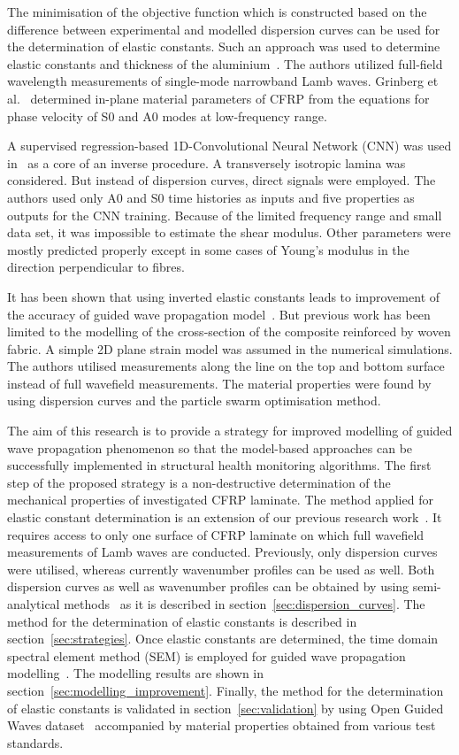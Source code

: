 \documentclass[preprint,12pt]{elsarticle}
\begin{document}
The minimisation of the objective function which is constructed based on the difference between experimental and modelled dispersion curves can be used for the determination of elastic constants.
Such an approach was used to determine elastic constants and thickness of the aluminium~\cite{Dean2008}.
The authors utilized full-field wavelength measurements of single-mode narrowband Lamb waves. Grinberg et al.~\cite{Grimberg2010} determined in-plane material parameters of CFRP from the equations for phase velocity of S0 and A0 modes at low-frequency range.

A supervised regression-based 1D-Convolutional Neural Network (CNN) was used in~\cite{Rautela2020} as a core of an inverse procedure.
A transversely isotropic lamina was considered. 
But instead of dispersion curves, direct signals were employed.
The authors used only A0 and S0 time histories as inputs and five properties as outputs for the CNN training.
Because of the limited frequency range and small data set, it was impossible to estimate the shear modulus. 
Other parameters were mostly predicted properly except in some cases of Young's modulus in the direction perpendicular to fibres.

It has been shown that using inverted elastic constants leads to improvement of the accuracy of guided wave propagation model~\cite{Ong2016}.
But previous work has been limited to the modelling of the cross-section of the composite reinforced by woven fabric.
A simple 2D plane strain model was assumed in the numerical simulations.
The authors utilised measurements along the line on the top and bottom surface instead of full wavefield measurements.
The material properties were found by using dispersion curves and the particle swarm optimisation method.

The aim of this research is to provide a strategy for improved modelling of guided wave propagation phenomenon so that the model-based approaches can be successfully implemented in structural health monitoring algorithms.
The first step of the proposed strategy is a non-destructive determination of the mechanical properties of investigated CFRP laminate.
The method applied for elastic constant determination is an extension of our previous research work~\cite{Kudela2020}.	
It requires access to only one surface of CFRP laminate on which full wavefield measurements of Lamb waves are conducted.
Previously, only dispersion curves were utilised, whereas currently wavenumber profiles can be used as well.
Both dispersion curves as well as wavenumber profiles can be obtained by using semi-analytical methods~\cite{Bartoli2006,Marzani2008} as it is described in section~\ref{sec:dispersion_curves}.
The method for the determination of elastic constants is described in section~\ref{sec:strategies}.
Once elastic constants are determined, the time domain spectral element method (SEM) is employed for guided wave propagation modelling~\cite{Kudela2020a}.
The modelling results are shown in section~\ref{sec:modelling_improvement}.
Finally, the method for the determination of elastic constants is validated in section~\ref{sec:validation} by using Open Guided Waves dataset~\cite{Moll2019} accompanied by material properties obtained from various test standards.
	
\end{document}
